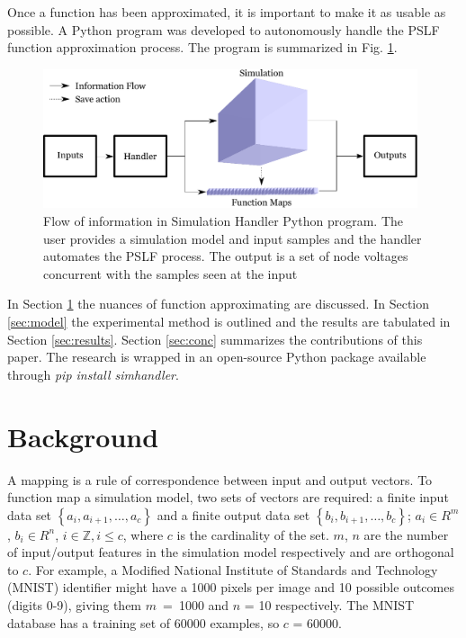 \documentclass[conference]{IEEEtran}
\begin{document}
Once a function has been approximated, it is important to make it as usable as possible. A Python program was developed to autonomously handle the PSLF function approximation process. The program is summarized in Fig. \ref{fig:infoflow}.

\setcounter{figure}{2} %
\begin{figure}[h]
	\centering
	\includegraphics[width=11cm]{informationflow.pdf}
	\caption{Flow of information in Simulation Handler Python program. The user provides a simulation model and input samples and the handler automates the PSLF process. The output is a set of node voltages concurrent with the samples seen at the input	}
	\label{fig:infoflow}
\end{figure}

In Section \ref{sec:relwork} the nuances of function approximating are discussed. In Section \ref{sec:model} the experimental method is outlined and the results are tabulated in Section \ref{sec:results}. Section \ref{sec:conc} summarizes the contributions of this paper. The research is wrapped in an open-source Python package available through \textit{pip install simhandler}.

\section{Background}
\label{sec:relwork}
A mapping is a rule of correspondence between input and output vectors. To function map a simulation model, two sets of vectors are required: a finite input data set $\left\{a_{i}, a_{i+1}, \ldots, a_{c}\right\}$ and a finite output data set $\left\{b_{i}, b_{i+1}, \ldots, b_{c}\right\}$; $a_{i} \in R^{m}$, $b_{i} \in R^{n}$, $i \in \mathbb{Z}, i \leq c$, where $c$ is the cardinality of the set. $m$, $n$ are the number of input/output features in the simulation model respectively and are orthogonal to $c$. For example, a Modified National Institute of Standards and Technology (MNIST) \cite{mnist} identifier might have a 1000 pixels per image and 10 possible outcomes (digits 0-9), giving them $m$~=~1000 and $n$ = 10 respectively. The MNIST database has a training set of 60000 examples, so $c$ = 60000.
\end{document}
